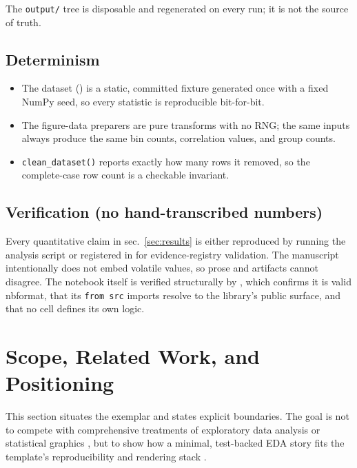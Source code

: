 \documentclass[
  english,
]{article}
\providecommand{\tightlist}{%
  \setlength{\itemsep}{0pt}\setlength{\parskip}{0pt}}
\begin{document}
The \texttt{output/} tree is disposable and regenerated on every run; it
is not the source of truth.

\subsection{Determinism}\label{determinism}

\begin{itemize}
\tightlist
\item
  The dataset () is a static, committed
  fixture generated once with a fixed NumPy seed, so every statistic is
  reproducible bit-for-bit.
\item
  The figure-data preparers are pure transforms with no RNG; the same
  inputs always produce the same bin counts, correlation values, and
  group counts.
\item
  \texttt{clean\_dataset()} reports exactly how many rows it removed, so
  the complete-case row count is a checkable invariant.
\end{itemize}

\subsection{Verification (no hand-transcribed
numbers)}\label{verification-no-hand-transcribed-numbers}

Every quantitative claim in sec.~\ref{sec:results} is either reproduced
by running the analysis script or registered in
 for evidence-registry validation. The
manuscript intentionally does not embed volatile values, so prose and
artifacts cannot disagree. The notebook itself is verified structurally
by , which confirms it is valid
nbformat, that its \texttt{from\ src} imports resolve to the library's
public surface, and that no cell defines its own logic.

\newpage

\section{Scope, Related Work, and Positioning}\label{sec:scope}

This section situates the exemplar and states explicit boundaries. The
goal is not to compete with comprehensive treatments of exploratory data
analysis \citep{tukey1977eda} or statistical graphics
\citep{wilkinson2005grammar}, but to show how a minimal, test-backed EDA
story fits the template's reproducibility and rendering stack
\citep{peng2011reproducible}.
\end{document}
